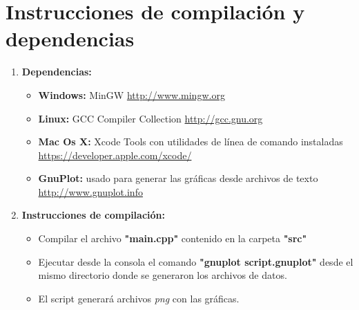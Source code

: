 \section{Instrucciones de compilación y dependencias}
\begin{enumerate}
	\item \textbf{Dependencias:}
		\begin{itemize}
			\item \textbf{Windows:}  MinGW  \url{http://www.mingw.org}
			\item \textbf{Linux:} GCC Compiler Collection  \url{http://gcc.gnu.org}
			\item \textbf{Mac Os X:} Xcode Tools con utilidades de línea de comando instaladas  							\url{https://developer.apple.com/xcode/}
			\item \textbf{GnuPlot:}  usado para generar las gr\'aficas desde archivos de texto 								\url{http://www.gnuplot.info}
		\end{itemize}
	\item \textbf{Instrucciones de compilaci\'on:}
			\begin{itemize}
			\item Compilar el archivo \textbf{"main.cpp"} contenido en la carpeta \textbf{"src"}
			\item Ejecutar desde la consola el comando \textbf{"gnuplot script.gnuplot"} desde el 					mismo directorio donde se generaron los archivos de datos.
			\item El script generar\'a archivos \emph{png} con las gr\'aficas.
			\end{itemize}
\end{enumerate}